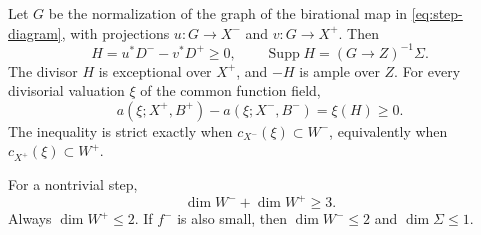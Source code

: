 \begin{lemma}\label{lem:graph}
Let $G$ be the normalization of the graph of the birational map in \eqref{eq:step-diagram}, with projections $u:G\to X^-$ and $v:G\to X^+$. Then
\[
 H=u^*D^- -v^*D^+\geq0,
 \qquad
 \operatorname{Supp}H=(G\to Z)^{-1}\Sigma.
\]
The divisor $H$ is exceptional over $X^+$, and $-H$ is ample over $Z$. For every divisorial valuation $\xi$ of the common function field,
\begin{equation}\label{eq:discrepancy-comparison}
 a(\xi;X^+,B^+)-a(\xi;X^-,B^-)=\xi(H)\geq0.
\end{equation}
The inequality is strict exactly when $c_{X^-}(\xi)\subset W^-$, equivalently when $c_{X^+}(\xi)\subset W^+$.

For a nontrivial step,
\begin{equation}\label{eq:graph-dimension}
 \dim W^-+\dim W^+\geq3.
\end{equation}
Always $\dim W^+\leq2$. If $f^-$ is also small, then $\dim W^-\leq2$ and $\dim\Sigma\leq1$.
\end{lemma}

